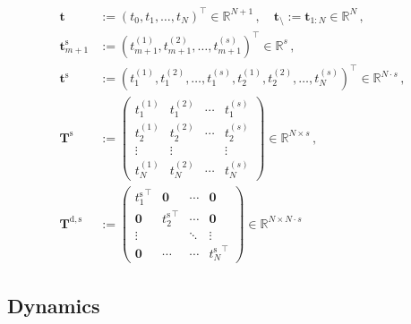 \documentclass{article}
\newcommand{\defeq}{\mathrel{:=}}%
\newcommand{\tp}{\top}%
\newcommand{\setR}{\mathbb{R}}%
\newcommand{\vectorfont}[1]{\boldsymbol{#1}}%
\newcommand{\matrixfont}[1]{\mathbf{#1}}%
\newcommand{\tvec}{\vectorfont{t}}
\newcommand{\Tmat}{\matrixfont{T}}
\newcommand{\Nullmat}{\matrixfont{0}}
\begin{document}
\begin{align*}
\tvec &\defeq (t_0, t_1, \ldots, t_{N})^{\tp} \in \setR^{N+1}\,,\quad \tvec_{\setminus} \defeq \tvec_{1:N} \in \setR^N\,,
\\
\tvec_{m+1}^{\mathrm{s}} &\defeq (t_{m+1}^{(1)}, t_{m+1}^{(2)}, \ldots, t_{m+1}^{(s)})^{\tp} \in \setR^{s}\,,
\\
\tvec^{\mathrm{s}} &\defeq (t_1^{(1)}, t_1^{(2)}, \ldots, t_1^{(s)}, t_2^{(1)}, t_2^{(2)}, \ldots, t_N^{(s)})^{\tp} \in \setR^{N \cdot s}\,,
\\
\Tmat^{\mathrm{s}} &\defeq \begin{pmatrix}t_1^{(1)} & t_1^{(2)}& \cdots & t_1^{(s)}\\
t_2^{(1)} & t_2^{(2)}& \cdots & t_2^{(s)}\\
\vdots & \vdots&  & \vdots\\
t_N^{(1)} & t_N^{(2)}& \cdots & t_N^{(s)}
             \end{pmatrix} \in \setR^{N \times s}\,,
\\
\Tmat^{\mathrm{d,s}} &\defeq \begin{pmatrix}
{t_1^{\mathrm{s}}}^{\tp} & \Nullmat  & \cdots & \Nullmat\\
\Nullmat               & {t_2^{\mathrm{s}}}^{\tp} & \cdots & \Nullmat \\
\vdots                 &                          & \ddots & \vdots  \\
\Nullmat               & \cdots                   & \cdots & {t_N^{\mathrm{s}}}^{\tp} 
\end{pmatrix} \in \setR^{N \times N \cdot s}
\end{align*}

\subsection*{Dynamics}
\end{document}
